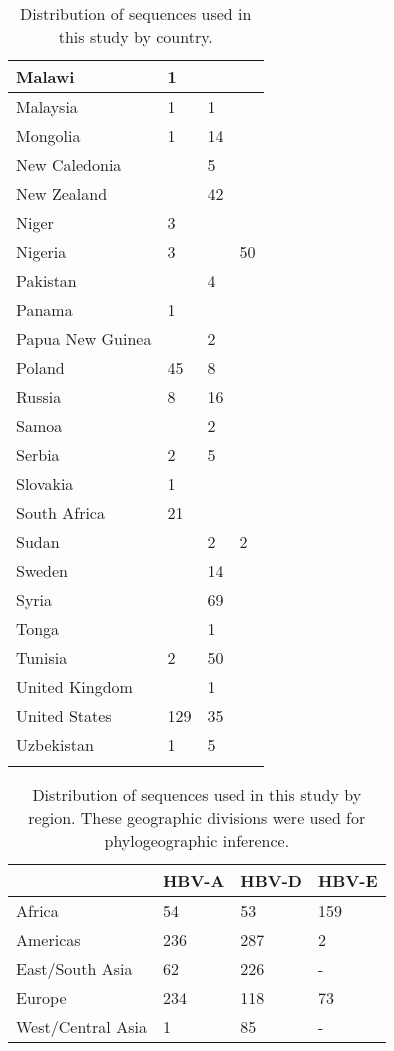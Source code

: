 \begin{longtable}{|l|l|l|l|}
    Malawi & 1 &  &  \\ \hline
    Malaysia & 1 & 1 &  \\ \hline
    Mongolia & 1 & 14 &  \\ \hline
    New Caledonia &  & 5 &  \\ \hline
    New Zealand &  & 42 &  \\ \hline
    Niger & 3 &  &  \\ \hline
    Nigeria & 3 &  & 50 \\ \hline
    Pakistan &  & 4 &  \\ \hline
    Panama & 1 &  &  \\ \hline
    Papua New Guinea &  & 2 &  \\ \hline
    Poland & 45 & 8 &  \\ \hline
    Russia & 8 & 16 &  \\ \hline
    Samoa &  & 2 &  \\ \hline
    Serbia & 2 & 5 &  \\ \hline
    Slovakia & 1 &  &  \\ \hline
    South Africa & 21 &  &  \\ \hline
    Sudan &  & 2 & 2 \\ \hline
    Sweden &  & 14 &  \\ \hline
    Syria &  & 69 &  \\ \hline
    Tonga &  & 1 &  \\ \hline
    Tunisia & 2 & 50 &  \\ \hline
    United Kingdom &  & 1 &  \\ \hline
    United States & 129 & 35 &  \\ \hline
    Uzbekistan & 1 & 5 &  \\ \hline
    \caption{Distribution of sequences used in this study by country.}
    \label{suptab:hbv-s6}\\
    \end{longtable}

\begin{table}[htp]
\begin{tabular}{|l|l|l|l|}
\hline
    & HBV-A & HBV-D & HBV-E \\ \hline
Africa & 54 & 53 & 159 \\ \hline
Americas & 236 & 287 & 2 \\ \hline
East/South Asia & 62 & 226 & - \\ \hline
Europe & 234 & 118 & 73 \\ \hline
West/Central Asia & 1 & 85 & - \\ \hline
\end{tabular}
\caption{Distribution of sequences used in this study by region. These geographic divisions were used for phylogeographic inference.}
\label{suptab:hbv-s7}
\end{table}


